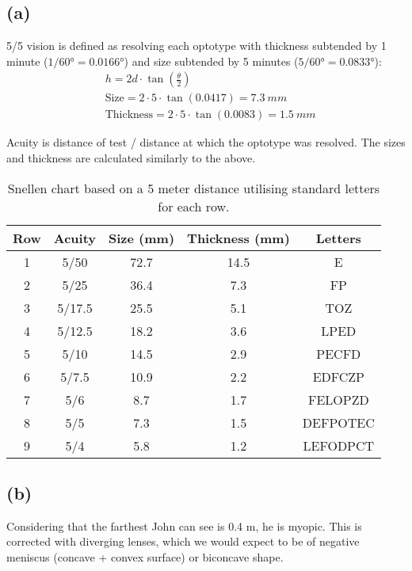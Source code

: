 \subsection*{(a)}
5/5 vision is defined as resolving each optotype with thickness subtended by 1 minute ($ 1/\ang{60} = \ang{0.0166}$) and size subtended by 5 minutes ($ 5/\ang{60} = \ang{0.0833}$):
\begin{equation}
    \begin{split}
        &h = 2d \cdot \tan \left(\frac{\theta}{2}\right) \\
        &\text{Size} = 2 \cdot 5 \cdot \tan(0.0417) = \SI{7.3}{mm} \\
        &\text{Thickness}  = 2 \cdot 5 \cdot \tan(0.0083) = \SI{1.5}{mm}
    \end{split}
\end{equation}

Acuity is distance of test / distance at which the optotype was resolved. The sizes and thickness are calculated similarly to the above.

\begin{table}[h] \centering
    \begin{tabular}{ccccc}
        \toprule
        Row & Acuity & Size (mm) & Thickness (mm) & Letters\\
        \midrule
        1 & 5/50 &72.7 & 14.5 & E \\
        2 & 5/25& 36.4 & 7.3 & FP \\
        3 & 5/17.5&25.5 & 5.1 & TOZ \\
        4 & 5/12.5&18.2 & 3.6 & LPED \\
        5 & 5/10& 14.5 & 2.9 & PECFD \\
        6 & 5/7.5& 10.9 & 2.2 & EDFCZP \\
        7 & 5/6 &8.7 & 1.7 & FELOPZD \\
        8 & 5/5& 7.3 & 1.5 & DEFPOTEC \\
        9 & 5/4& 5.8 & 1.2 & LEFODPCT \\
        \bottomrule
    \end{tabular}
    \caption{Snellen chart based on a 5 meter distance utilising standard letters for each row.}
\end{table}

\subsection*{(b)}

Considering that the farthest John can see is 0.4 m, he is myopic. This is corrected with diverging lenses, which we would expect to be of negative meniscus (concave + convex surface) or biconcave shape. 

